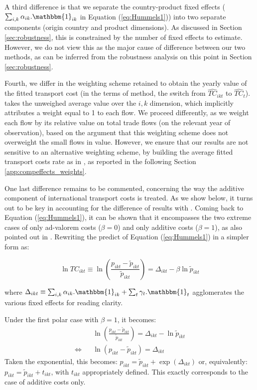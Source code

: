 \documentclass[a4paper,11pt]{article}
\begin{document}
A third difference is that we separate the country-product fixed effects ($\sum_{i,k}\alpha_{ik}.\mathbbm{1}_{ik}$ in Equation (\ref{eq:Hummels1})) into two separate components (origin country and product dimensions).
As discussed in Section \ref{sec:robustness}, this is constrained by the number of fixed effects to estimate.
However, we do not view this as the major cause of difference between our two methods, as can be inferred from the robustness analysis on this point in Section \ref{sec:robustness}.

Fourth, we differ in the weighting scheme retained to obtain the yearly value of the fitted transport cost (in the terms of \cite{hummels2007} method, the switch from $\widehat{TC}_{ikt}$ to $\widehat{TC}_{t}$). \cite{hummels2007} takes the unweighed average value over the $i,k$ dimension, which implicitly attributes a weight equal to 1 to each flow. We proceed differently, as we weight each flow by its relative value on total trade flows (on the relevant year of observation), based on the argument that this weighting scheme does not overweight the small flows in value. However, we ensure that our results are not sensitive to an alternative weighting scheme, by building the average fitted transport costs rate as in \cite{hummels2007}, as reported in the following Section \ref{app:compeffects_weights}.

One last difference remains to be commented, concerning the way the additive component of international transport costs is treated.
As we show below, it turns out to be key in accounting for the difference of results with \cite{hummels2007}.
Coming back to Equation (\ref{eq:Hummels1}), it can be shown that it encompasses the two extreme cases of only ad-valorem costs ($\beta = 0$) and only additive costs ($\beta=1$), as also pointed out in \cite{hummels_skiba}. Rewriting the predict of Equation (\ref{eq:Hummels1}) in a simpler form as:

$$\ln TC_{ikt} \equiv \ln \left(\frac{p_{ikt}- \widetilde{p}_{ikt}}{\widetilde{p}_{ikt}} \right) = \Delta_{ikt}- \beta \ln \widetilde{p}_{ikt} $$

\noindent where $\Delta_{ikt} \equiv \sum_{i,k}\alpha_{ik}.\mathbbm{1}_{ik}+ \sum_{t}\gamma_{t}.\mathbbm{1}_{t}$ agglomerates the various fixed effects for reading clarity.

Under the first polar case with $\beta = 1$, it becomes:
\begin{eqnarray*}
&&\ln \left(\frac{p_{ikt}- \widetilde{p}_{ikt}}{\widetilde{p}_{ikt}} \right) = \Delta_{ikt}- \ln \widetilde{p}_{ikt} \\
\Leftrightarrow && \ln (p_{ikt}- \widetilde{p}_{ikt}) = \Delta_{ikt}
\end{eqnarray*}
\noindent Taken the exponential, this becomes: $p_{ikt} = \widetilde{p}_{ikt} + \exp(\Delta_{ikt})$ or, equivalently: $p_{ikt} = \widetilde{p}_{ikt} + t_{ikt}$, with $t_{ikt}$ appropriately defined. This exactly corresponds to the case of additive costs only.
\end{document}
